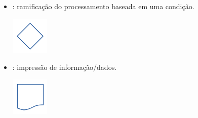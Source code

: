 \begin{itemize}
\item {}: ramificação do processamento baseada em uma condição.
  \begin{center}
    \includegraphics{./cap_lingua/dados/fig_fluxograma/decisao}
  \end{center}
\item {}: impressão de informação/dados.
  \begin{center}
    \includegraphics{./cap_lingua/dados/fig_fluxograma/saida}
\end{center}
\end{itemize}


